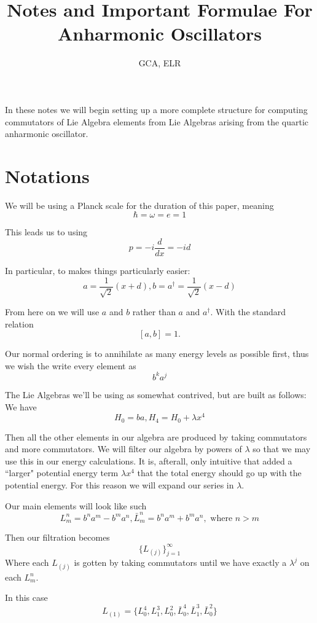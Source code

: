 \documentclass{article}
\title{Notes and Important Formulae For Anharmonic Oscillators}
\author{GCA, ELR}
\begin{document}
\maketitle


In these notes we will begin setting up a more complete structure for computing commutators of Lie Algebra elements from Lie Algebras arising from the quartic anharmonic oscillator.\\




\section*{Notations}

We will be using a Planck scale for the duration of this paper, meaning
\[
\hbar = \omega = e = 1
\]

This leads us to using 
\[
p = -i \frac{d}{dx} = -id
\]

In particular, to makes things particularly easier:
\[
a = \frac{1}{\sqrt{2}}(x+d), b = a^{\dagger} = \frac{1}{\sqrt{2}}(x-d)
\]	
	
	
From here on we will use $a$ and $b$ rather than $a$ and $a^{\dagger}$.  With the standard relation
\[
[a,b]=1.
\]	
	
	
Our normal ordering is to annihilate as many energy levels as possible first, thus we wish the write every element as
\[
b^ka^j
\] 	


The Lie Algebras we'll be using as somewhat contrived, but are built as follows:  We have
\[
H_0 = ba, H_4 = H_0 + \lambda x^4
\]

Then all the other elements in our algebra are produced by taking commutators and more commutators.  We will filter our algebra by powers of $\lambda$ so that we may use this in our energy calculations.  It is, afterall, only intuitive that added a ``larger" potential energy term $\lambda x^4$ that the total energy should go up with the potential energy.  For this reason we will expand our series in $\lambda$.

Our main elements will look like such
\[
L_m^n = b^n a^m - b^m a^n, \bar{L}_m^n = b^n a^m + b^m a^n, \textrm{ where } n>m
\]

Then our filtration becomes
\[
\{L_{(j)}\}_{j=1}^{\infty} 
\]
Where each $L_{(j)}$ is gotten by taking commutators until we have exactly a $\lambda^j$ on each $L_m^n$.

In this case
\[
L_{(1)} = \{ L_0^4, L_1^3, L_0^2, \bar{L}_0^4, \bar{L}_1^3, \bar{L}_0^2\}
\]
\end{document}
